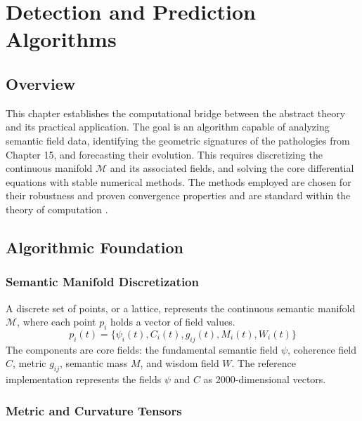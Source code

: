 \chapter{Detection and Prediction Algorithms}

\section{Overview}

This chapter establishes the computational bridge between the abstract theory and its practical application. The goal is an algorithm capable of analyzing semantic field data, identifying the geometric signatures of the pathologies from Chapter 15, and forecasting their evolution. This requires discretizing the continuous manifold \(\mathcal{M}\) and its associated fields, and solving the core differential equations with stable numerical methods. The methods employed are chosen for their robustness and proven convergence properties and are standard within the theory of computation \autocite{Sipser2012}.

\section{Algorithmic Foundation}

\subsection{Semantic Manifold Discretization}

A discrete set of points, or a lattice, represents the continuous semantic manifold \(\mathcal{M}\), where each point \(p_i\) holds a vector of field values.
\begin{equation}
p_i(t) = \{\psi_i(t), C_i(t), g_{ij}(t), M_i(t), W_i(t)\}
\end{equation}
The components are core fields: the fundamental semantic field \(\psi\), coherence field \(C\), metric \(g_{ij}\), semantic mass \(M\), and wisdom field \(W\). The reference implementation represents the fields \(\psi\) and \(C\) as 2000-dimensional vectors.

\subsection{Metric and Curvature Tensors}

